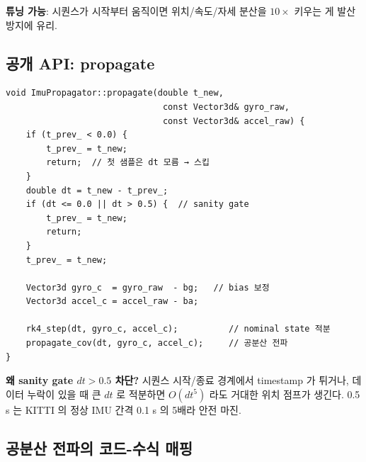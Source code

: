 \documentclass[11pt,a4paper,oneside]{report}
\begin{document}
\textbf{튜닝 가능}: 시퀀스가 시작부터 움직이면 위치/속도/자세 분산을 \(10\times\) 키우는 게 발산 방지에 유리.

\subsection{공개 API: propagate}

\begin{lstlisting}[style=cpp,caption={\texttt{imu\_propagator.cpp:129-149}}]
void ImuPropagator::propagate(double t_new,
                               const Vector3d& gyro_raw,
                               const Vector3d& accel_raw) {
    if (t_prev_ < 0.0) {
        t_prev_ = t_new;
        return;  // 첫 샘플은 dt 모름 → 스킵
    }
    double dt = t_new - t_prev_;
    if (dt <= 0.0 || dt > 0.5) {  // sanity gate
        t_prev_ = t_new;
        return;
    }
    t_prev_ = t_new;

    Vector3d gyro_c  = gyro_raw  - bg;   // bias 보정
    Vector3d accel_c = accel_raw - ba;

    rk4_step(dt, gyro_c, accel_c);          // nominal state 적분
    propagate_cov(dt, gyro_c, accel_c);     // 공분산 전파
}
\end{lstlisting}

\textbf{왜 sanity gate \(dt > 0.5\) 차단?} 시퀀스 시작/종료 경계에서 timestamp 가 튀거나, 데이터 누락이 있을 때 큰 \(dt\) 로 적분하면 \(O(dt^5)\) 라도 거대한 위치 점프가 생긴다. 0.5 s 는 KITTI 의 정상 IMU 간격 0.1 s 의 5배라 안전 마진.

\subsection{공분산 전파의 코드-수식 매핑}
\end{document}
